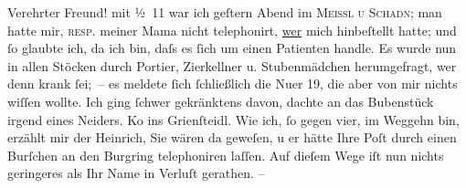 \pstart{}Verehrter Freund!\pend\vspace{0.5em}
\pstart
           mit ½ 11 war ich geſtern Abend im \textsc{Meissl u Schadn}; man hatte mir, \textsc{resp.} meiner Mama nicht telephonirt, \uline{wer}
               mich hinbeſtellt hatte; und{ }ſo glaubte ich, da ich \label{K_L03906-1v}\label{K_L03906-1} bin, daſs es{ }ſich um einen
               Patienten handle. Es wurde nun in allen Stöcken durch Portier, {\pb}Zi{\geminationm}erkellner u. Stubenmädchen
               herumgefragt, wer denn krank{ }ſei; – es meldete{ }ſich{ }ſchließlich die Nu{\geminationm}er 19, die aber von mir nichts wiſſen wollte. Ich ging{ }ſchwer gekränktens davon, dachte an das Bubenstück irgend eines Neiders. Ko{\geminationm} ins Grienſteidl. Wie ich,{ }ſo gegen vier, im Weggehn
               bin, erzählt mir der Heinrich, Sie wären da
               geweſen, u er {\pb}hätte Ihre Poſt durch einen Burſchen an den
                  Burgring telephoniren laſſen. Auf dieſem
               Wege iſt nun nichts geringeres als Ihr Name in Verluſt gerathen. –\pend
           
